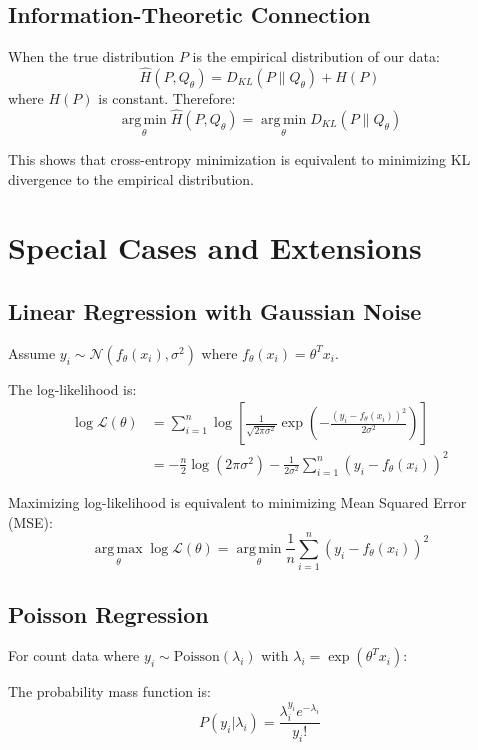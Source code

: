 \begin{notechapter}
\subsection{Information-Theoretic Connection}

When the true distribution $P$ is the empirical distribution of our data:
\[
\hat{H}(P, Q_\theta) = D_{KL}(P \parallel Q_\theta) + H(P)
\]
where $H(P)$ is constant. Therefore:
\[
\operatorname*{arg\,min}_{\theta} \hat{H}(P, Q_\theta) = \operatorname*{arg\,min}_{\theta} D_{KL}(P \parallel Q_\theta)
\]

This shows that cross-entropy minimization is equivalent to minimizing KL divergence to the empirical distribution.

\section{Special Cases and Extensions}

\subsection{Linear Regression with Gaussian Noise}

Assume $y_i \sim \mathcal{N}(f_\theta(x_i), \sigma^2)$ where $f_\theta(x_i) = \theta^T x_i$.

The log-likelihood is:
\begin{align*}
\log \mathcal{L}(\theta) &= \sum_{i=1}^n \log \left[ \frac{1}{\sqrt{2\pi\sigma^2}} \exp\left(-\frac{(y_i - f_\theta(x_i))^2}{2\sigma^2}\right) \right] \\
&= -\frac{n}{2} \log(2\pi\sigma^2) - \frac{1}{2\sigma^2} \sum_{i=1}^n (y_i - f_\theta(x_i))^2
\end{align*}

Maximizing log-likelihood is equivalent to minimizing Mean Squared Error (MSE):
\[
\operatorname*{arg\,max}_{\theta} \log \mathcal{L}(\theta) = \operatorname*{arg\,min}_{\theta} \frac{1}{n} \sum_{i=1}^n (y_i - f_\theta(x_i))^2
\]

\subsection{Poisson Regression}

For count data where $y_i \sim \text{Poisson}(\lambda_i)$ with $\lambda_i = \exp(\theta^T x_i)$:

The probability mass function is:
\[
P(y_i|\lambda_i) = \frac{\lambda_i^{y_i} e^{-\lambda_i}}{y_i!}
\]


\end{notechapter}
